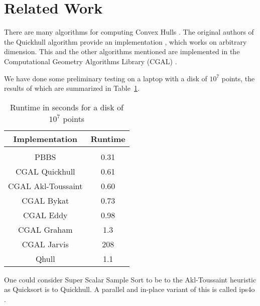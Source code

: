 \section{Related Work}

There are many algorithms for computing Convex Hulls \cite{}. The original
authors of the Quickhull algorithm provide an implementation \cite{qhull},
which works on arbitrary dimension. This and the other algorithms mentioned
are implemented in the Computational Geometry Algorithms Library (CGAL) 
\cite{cgal}.

We have done some preliminary testing on a laptop with a disk of $10^7$ points,
the results of which are summarized in Table~\ref{table:reference}.

\begin{table}[ht]
    \caption{Runtime in seconds for a disk of $10^7$ points}
    \label{table:reference}
    \begin{tabular}{c | c }
     Implementation & Runtime \\
     \hline \\
     PBBS & 0.31 \\
     CGAL Quickhull & 0.61 \\
     CGAL Akl-Toussaint & 0.60 \\
     CGAL Bykat & 0.73 \\
     CGAL Eddy & 0.98 \\
     CGAL Graham & 1.3 \\
     CGAL Jarvis & 208 \\
     Qhull & 1.1 \\
    \end{tabular}
\end{table}


One could consider Super Scalar Sample Sort \cite{ssss} to be to the
Akl-Toussaint heuristic as Quicksort is to Quickhull. A parallel and in-place
variant of this is called ips4o \cite{ips4o}.
